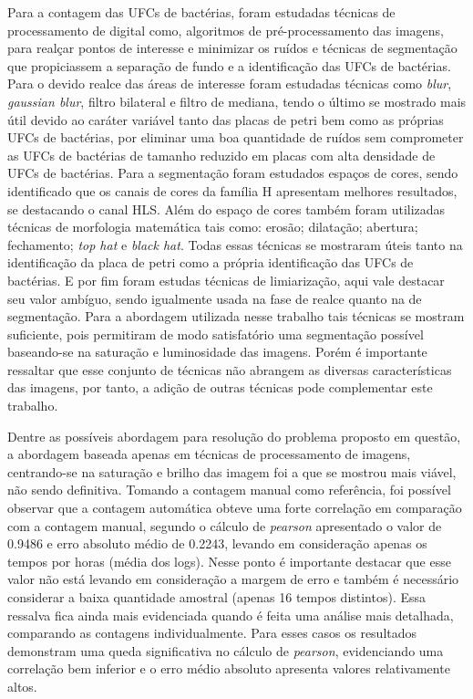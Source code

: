 Para a contagem das UFCs de bactérias, foram estudadas técnicas de processamento de digital como, algoritmos de pré-processamento das imagens, para realçar pontos de interesse e minimizar os ruídos e técnicas de segmentação que propiciassem a separação de fundo e a identificação das UFCs de bactérias. Para o devido realce das áreas de interesse foram estudadas técnicas como \textit{blur}, \textit{gaussian blur}, filtro bilateral e filtro de mediana, tendo o último se mostrado mais útil devido ao caráter variável tanto das placas de petri bem como as próprias UFCs de bactérias, por eliminar uma boa quantidade de ruídos sem comprometer as UFCs de bactérias de tamanho reduzido em placas com alta densidade de UFCs de bactérias. Para a segmentação foram estudados espaços de cores, sendo identificado que os canais de cores da família H apresentam melhores resultados, se destacando o canal HLS. Além do espaço de cores também foram utilizadas técnicas de morfologia matemática tais como: erosão; dilatação; abertura; fechamento; \textit{top hat} e \textit{black hat}. Todas essas técnicas se mostraram úteis tanto na identificação da placa de petri como a própria identificação das UFCs de bactérias. E por fim foram estudas técnicas de limiarização, aqui vale destacar seu valor ambíguo, sendo igualmente usada na fase de realce quanto na de segmentação. Para a abordagem utilizada nesse trabalho tais técnicas se mostram suficiente, pois permitiram de modo satisfatório uma segmentação possível baseando-se na saturação e luminosidade das imagens. Porém é importante ressaltar que esse conjunto de técnicas não abrangem as diversas características das imagens, por tanto, a adição de outras técnicas pode complementar este trabalho.

Dentre as possíveis abordagem para resolução do problema proposto em questão, a abordagem baseada apenas em técnicas de processamento de imagens, centrando-se na saturação e brilho das imagem foi a que se mostrou mais viável, não sendo definitiva. Tomando a contagem manual como referência, foi possível observar que a contagem automática obteve uma forte correlação em comparação com a contagem manual, segundo o cálculo de \textit{pearson} apresentado o valor de 0.9486 e erro absoluto médio de 0.2243, levando em consideração apenas os tempos por horas (média dos logs). Nesse ponto é importante destacar que esse valor não está levando em consideração a margem de erro e também é necessário considerar a baixa quantidade amostral (apenas 16 tempos distintos). Essa ressalva fica ainda mais evidenciada quando é feita uma análise mais detalhada, comparando as contagens individualmente. Para esses casos os resultados demonstram uma queda significativa no cálculo de \textit{pearson}, evidenciando uma correlação bem inferior e o erro médio absoluto apresenta valores relativamente altos.

